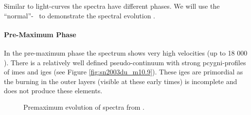 Similar to light-curves the spectra have different phases. We will use the ``normal''-\snia\  to demonstrate the spectral evolution \citep{2011MNRAS.410.1725T}. 

\paragraph{Pre-Maximum Phase}
In the pre-maximum phase the spectrum shows very high velocities (up to 18 000 \kms). There is a relatively well defined pseudo-continuum with strong \gls{pcygni}-profiles of \glspl{ime} and \glspl{ige} (see Figure \ref{fig:sn2003du_m10.9}). These \glspl{ige} are primordial as the burning in the outer layers (visible at these early times) is incomplete and does not produce these elements. 


\begin{figure}[htbp] %
   \centering
   \caption{Premaximum evolution of  spectra from \cite{2011MNRAS.410.1725T}.}
   \label{fig:sn2003du_premax}
\end{figure}


